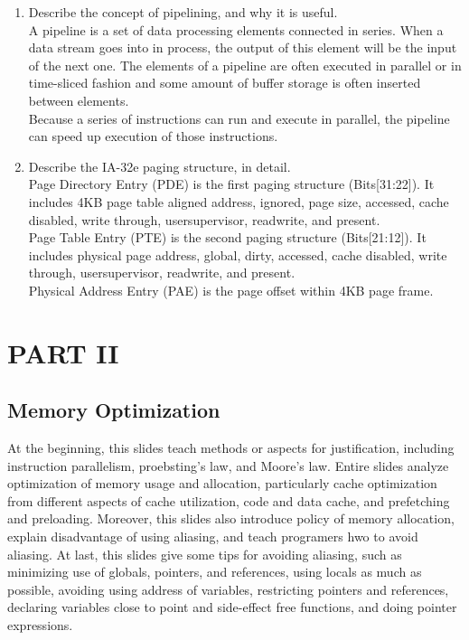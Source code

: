 \documentclass[letterpaper, onecolumn, 10pt]{IEEEtran}
\begin{document}
\begin{enumerate}
\item Describe the concept of pipelining, and why it is useful.
\\\newline
A pipeline is a set of data processing elements connected in series. When a data stream goes into in process, the output of this element will be the input of the next one. The elements of a pipeline are often executed in parallel or in time-sliced fashion and some amount of buffer storage is often inserted between elements.
\\\newline
Because a series of instructions can run and execute in parallel, the pipeline can speed up execution of those instructions.
\\
\item Describe the IA-32e paging structure, in detail.
\\\newline
Page Directory Entry (PDE) is the first paging structure (Bits[31:22]). It includes 4KB page table aligned address, ignored, page size, accessed, cache disabled, write through, user\/supervisor, read\/write, and present.
\\\newline
Page Table Entry (PTE) is the second paging structure (Bits[21:12]). It includes physical page address, global, dirty, accessed, cache disabled, write through, user\/supervisor, read\/write, and present.
\\\newline
Physical Address Entry (PAE) is the page offset within 4KB page frame.\\
\end{enumerate}

\section*{PART II}
\subsection*{Memory Optimization}
\noindent At the beginning, this slides teach methods or aspects for justification, including instruction parallelism, proebsting's law, and Moore's law. Entire slides analyze optimization of memory usage and allocation, particularly cache optimization from different aspects of cache utilization, code and data cache, and prefetching and preloading. Moreover, this slides also introduce policy of memory allocation, explain disadvantage of using aliasing, and teach programers hwo to avoid aliasing. At last, this slides give some tips for avoiding aliasing, such as minimizing use of globals, pointers, and references, using locals as much as possible, avoiding using address of variables, restricting pointers and references, declaring variables close to point and side-effect free functions, and doing pointer expressions.
\end{document}
